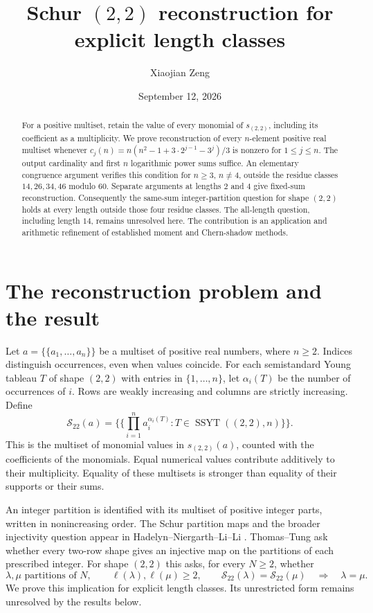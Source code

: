 \documentclass[11pt]{amsart}
\title[Schur $(2,2)$ reconstruction by length]{Schur $(2,2)$ reconstruction for explicit length classes}
\author{Xiaojian Zeng}
\date{September 12, 2026}
\theoremstyle{remark}
\newcommand{\Sxx}{\mathcal{S}_{22}}
\DeclareMathOperator{\SSYT}{SSYT}
\begin{document}
\begin{abstract}
For a positive multiset, retain the value of every monomial of
$s_{(2,2)}$, including its coefficient as a multiplicity. We prove
reconstruction of every $n$-element positive real multiset whenever
$c_j(n)=n(n^2-1+3\cdot2^{j-1}-3^j)/3$ is nonzero for $1\leq j\leq n$.
The output cardinality and first $n$ logarithmic power sums suffice.
An elementary congruence argument verifies this condition for $n\geq3$,
$n\ne4$, outside the residue classes $14,26,34,46$ modulo $60$.
Separate arguments at lengths $2$ and $4$ give fixed-sum reconstruction.
Consequently the same-sum integer-partition question for shape $(2,2)$
holds at every length outside those four residue classes. The all-length
question, including length $14$, remains unresolved here. The contribution
is an application and arithmetic refinement of established moment and
Chern-shadow methods.
\end{abstract}
\maketitle

\section{The reconstruction problem and the result}

Let $a=\{\!\{a_1,\ldots,a_n\}\!\}$ be a multiset of positive real numbers,
where $n\geq2$. Indices distinguish occurrences, even when values coincide.
For each semistandard Young tableau $T$ of shape $(2,2)$ with entries
in $\{1,\ldots,n\}$, let $\alpha_i(T)$ be the number of occurrences of $i$.
Rows are weakly increasing and columns are strictly increasing. Define
\begin{equation}\label{eq:definition}
 \Sxx(a)=\{\!\{\prod_{i=1}^n a_i^{\alpha_i(T)}:
                    T\in\SSYT((2,2),n)\}\!\}.
\end{equation}
This is the multiset of monomial values in $s_{(2,2)}(a)$, counted with
the coefficients of the monomials. Equal numerical values contribute
additively to their multiplicity. Equality of these multisets is stronger
than equality of their supports or their sums.

An integer partition is identified with its multiset of positive integer
parts, written in nonincreasing order. The Schur partition maps and the
broader injectivity question appear in
Hadelyn--Niergarth--Li--Li \cite[Section~5, Question~5.3]{HadelynEtAl2026}.
Thomas--Tung \cite[Conjecture~6.3]{ThomasTung2026} ask whether every
two-row shape gives an injective map on the partitions of each prescribed
integer. For shape $(2,2)$ this asks, for every $N\geq2$, whether
\begin{equation}\label{eq:original}
 \lambda,\mu\text{ partitions of }N,\qquad \ell(\lambda),\ell(\mu)\geq2,
 \qquad \Sxx(\lambda)=\Sxx(\mu)
 \quad\Longrightarrow\quad \lambda=\mu.
\end{equation}
We prove this implication for explicit length classes. Its unrestricted
form remains unresolved by the results below.
\end{document}
